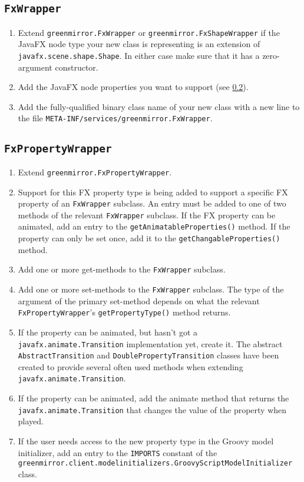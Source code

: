 \subsection{\texttt{FxWrapper}}\label{app:ext;sub:fxwrapper}
\begin{enumerate}
  \item Extend \lstinline{greenmirror.FxWrapper} or \lstinline{greenmirror.FxShapeWrapper} if the JavaFX node type your new class is representing is an extension of \lstinline{javafx.scene.shape.Shape}. In either case make sure that it has a zero-argument constructor.
  \item Add the JavaFX node properties you want to support (see \cref{app:ext;sub:fxpropertywrapper}).
  \item Add the fully-qualified binary class name of your new class with a new line to the file \lstinline{META-INF/services/greenmirror.FxWrapper}.
\end{enumerate}
\subsection{\texttt{FxPropertyWrapper}}\label{app:ext;sub:fxpropertywrapper}
\begin{enumerate}
  \item Extend \lstinline{greenmirror.FxPropertyWrapper}.
  \item Support for this FX property type is being added to support a specific FX property of an \lstinline{FxWrapper} subclass. An entry must be added to one of two methods of the relevant \lstinline{FxWrapper} subclass. If the FX property can be animated, add an entry to the \lstinline{getAnimatableProperties()} method. If the property can only be set once, add it to the \lstinline{getChangableProperties()} method.
  \item Add one or more get-methods to the \lstinline{FxWrapper} subclass.
  \item Add one or more set-methods to the \lstinline{FxWrapper} subclass. The type of the argument of the primary set-method depends on what the relevant \lstinline{FxPropertyWrapper}'s \lstinline{getPropertyType()} method returns.
  \item If the property can be animated, but hasn't got a \lstinline{javafx.animate.Transition} implementation yet, create it. The abstract \lstinline{AbstractTransition} and \lstinline{DoublePropertyTransition} classes have been created to provide several often used methods when extending \lstinline{javafx.animate.Transition}.
  \item If the property can be animated, add the animate method that returns the \lstinline{javafx.animate.Transition} that changes the value of the property when played.
  \item If the user needs access to the new property type in the Groovy model initializer, add an entry to the \lstinline{IMPORTS} constant of the \lstinline{greenmirror.client.modelinitializers.GroovyScriptModelInitializer} class.
\end{enumerate}
